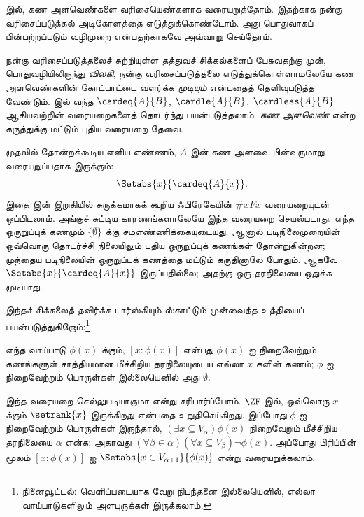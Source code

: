 \documentclass[../../../include/open-logic-section]{subfiles}
\begin{document}

 இல்,
கண அளவெண்களை வரிசையெண்களாக வரையறுத்தோம். இதற்காக நன்கு
வரிசைப்படுத்தல் அடிகோளத்தை எடுத்துக்கொண்டோம். அது பொதுவாகப்
பின்பற்றப்படும் வழிமுறை என்பதற்காகவே அவ்வாறு செய்தோம்.

நன்கு வரிசைப்படுத்தலைச் சுற்றியுள்ள தத்துவச் சிக்கல்களைப்
பேசுவதற்கு முன், பொதுவழியிலிருந்து \emph{விலகி}, நன்கு
வரிசைப்படுத்தலை எடுத்துக்கொள்ளாமலேயே கண அளவெண்களின்
கோட்பாட்டை வளர்க்க \emph{முடியும்} என்பதைத் தெளிவுபடுத்த
வேண்டும்.  இல் வந்த
$\cardeq{A}{B}$, $\cardle{A}{B}$, $\cardless{A}{B}$
ஆகியவற்றின் வரையறைகளைத் தொடர்ந்து பயன்படுத்தலாம்.
\emph{கண அளவெண்} என்ற கருத்துக்கு மட்டும் புதிய வரையறை தேவை.

முதலில் தோன்றக்கூடிய எளிய எண்ணம், $A$ இன் கண அளவை
பின்வருமாறு வரையறுப்பதாக இருக்கும்:
\[
	\Setabs{x}{\cardeq{A}{x}}.
\]
இதை  இன் இறுதியில் சுருக்கமாகக்
கூறிய ஃபிரேகேயின் $\# x Fx$ வரையறையுடன் ஒப்பிடலாம்.
அங்குச் சுட்டிய காரணங்களாலேயே இந்த வரையறை செயல்படாது.
எந்த ஓருறுப்புக் கணமும் $\{\emptyset\}$ க்கு சமஎண்ணிக்கையுடையது.
ஆனால் படிநிலைமுறையின் ஒவ்வொரு தொடர்ச்சி நிலையிலும் புதிய
ஓருறுப்புக் கணங்கள் தோன்றுகின்றன; முந்தைய படிநிலையின்
ஓருறுப்புக் கணத்தை மட்டும் கருதினாலே போதும். ஆகவே
$\Setabs{x}{\cardeq{A}{x}}$ இருப்பதில்லை; அதற்கு ஒரு
தரநிலையை ஒதுக்க முடியாது.

இந்தச் சிக்கலைத் தவிர்க்க டார்ஸ்கியும் ஸ்காட்டும் முன்வைத்த
உத்தியைப் பயன்படுத்துகிறோம்:\footnote{நினைவூட்டல்: வெளிப்படையாக
வேறு நிபந்தனை இல்லையெனில், எல்லா வாய்பாடுகளிலும் அளபுருக்கள்
இருக்கலாம்.}

\begin{defn}[டார்ஸ்கி--ஸ்காட்]
எந்த வாய்பாடு $\phi(x)$ க்கும், $[ x : \phi(x)] $ என்பது
$\phi(x)$ ஐ நிறைவேற்றும் கணங்களுள் சாத்தியமான மீச்சிறிய
தரநிலையுடைய எல்லா $x$ களின் கணம்; $\phi$ ஐ நிறைவேற்றும் பொருள்கள்
இல்லையெனில் அது $\emptyset$.
\end{defn}

இந்த வரையறை செல்லுபடியாகுமா என்று சரிபார்ப்போம். $\ZF$
இல், ஒவ்வொரு $x$ க்கும் $\setrank{x}$ இருக்கிறது என்பதை
 உறுதிசெய்கிறது.
இப்போது $\phi$ ஐ நிறைவேற்றும் பொருள்கள் இருந்தால்,
$(\exists x\subseteq V_\alpha)\phi(x)$ நிறைவேறும் மீச்சிறிய
தரநிலையை $\alpha$ என்க; அதாவது
$(\forall \beta \in \alpha)(\forall x \subseteq V_\beta)\lnot \phi(x)$.
அப்போது பிரிப்பின் மூலம் $[x : \phi(x)]$ ஐ
$\Setabs{x \in V_{\alpha+1}}{\phi(x)}$ என்று வரையறுக்கலாம்.
\end{document}
